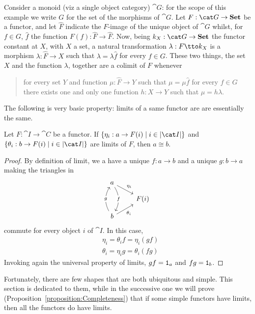 \begin{example}
 Consider a monoid (viz a single object category) \(\cat G\): for the scope of this example we write \(G\) for the set of the morphisms of \(\cat G\). Let \(F : \cat G \to \Set\) be a functor, and let \(\hat F\) indicate the \(F\)-image of the unique object of \(\cat G\) whilst, for \(f \in G\), \(\hat f\) the function \(F(f) : \hat F \to \hat F\). Now, being \(k_X : \cat G \to \Set\) the functor constant at \(X\), with \(X\) a set, a natural transformation \(\lambda : F \tto k_X\) is a morphism \(\lambda : \hat F \to X\) such that \(\lambda = \lambda \hat f\) for every \(f \in G\). These two things, the set \(X\) and the function \(\lambda\), together are a colimit of \(F\) whenever
\begin{quotation}
for every set \(Y\) and function \(\mu : \hat F \to Y\) such that \(\mu = \mu \hat f\) for every \(f \in G\) there exists one and only one function \(h : X \to Y\) such that \(\mu = h \lambda\).
\end{quotation}
 
\end{example}

\noindent{}

The following is very basic property: limits of a same functor are are essentially the same.

\begin{proposition}\label{proposition:LimitsAreIsomorphic}
Let \(F : \cat I \to \cat C\) be a functor. If \(\set{\eta_i : a \to F(i) \mid i \in \obj{\cat I}}\) and \(\set{\theta_i : b \to F(i) \mid i \in \obj{\cat I}}\) are limits of \(F\), then \(a \cong b\).
\end{proposition}

\begin{proof}
By definition of limit, we a have a unique \(f : a \to b\) and a unique \(g : b \to a\) making the triangles in
\[\begin{tikzcd}[row sep=small]
a \ar["{\eta_i}", dr] \ar["f" description, dd, bend left] \\
& F(i) \\
b \ar["{\theta_i}", ur, swap] \ar["g" description, uu, bend left]
\end{tikzcd}\]
commute for every object \(i\) of \(\cat I\). In this case,
\[\begin{aligned}
& \eta_i = \theta_i f = \eta_i (gf) \\
& \theta_i = \eta_i g = \theta_i (fg)
\end{aligned}\]
Invoking again the universal property of limits, \(gf = \mathtt 1_a\) and \(fg = \mathtt 1_b\).
\end{proof}

Fortunately, there are few shapes that are both ubiquitous and simple. This section is dedicated to them, while in the successive one we will prove (Proposition~\ref{proposition:Completeness}) that if some simple functors have limits, then all the functors do have limits.

